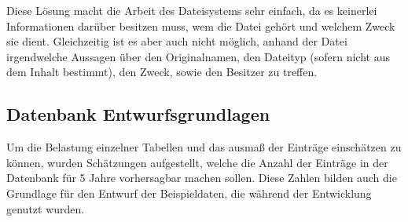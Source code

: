 \documentclass[10pt,a4paper,final,parskip]{scrartcl}
\begin{document}
Diese Lösung macht die Arbeit des Dateisystems sehr einfach, da es keinerlei Informationen darüber besitzen muss, wem die Datei gehört und welchem Zweck sie dient. Gleichzeitig ist es aber auch nicht möglich, anhand der Datei irgendwelche Aussagen über den Originalnamen, den Dateityp (sofern nicht aus dem Inhalt bestimmt), den Zweck, sowie den Besitzer zu treffen.

\subsection{Datenbank Entwurfsgrundlagen}
Um die Belastung einzelner Tabellen und das ausmaß der Einträge einschätzen zu können, wurden Schätzungen aufgestellt, welche die Anzahl der Einträge in der Datenbank für 5 Jahre vorhersagbar machen sollen. Diese Zahlen bilden auch die Grundlage für den Entwurf der Beispieldaten, die während der Entwicklung genutzt wurden.
\end{document}
